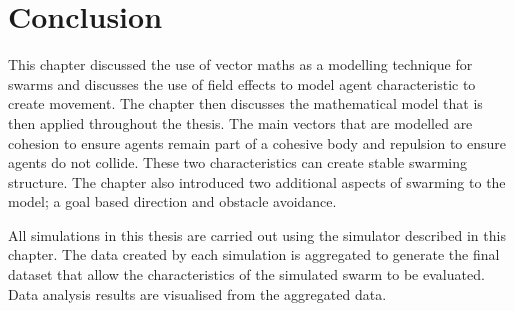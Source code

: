 \section{Conclusion}
This chapter discussed the use of vector maths as a modelling technique for swarms and discusses the use of field effects to model agent characteristic to create movement. The chapter then discusses the mathematical model that is then applied throughout the thesis. The main vectors that are modelled are cohesion to ensure agents remain part of a cohesive body and repulsion to ensure agents do not collide. These two characteristics can create stable swarming structure. The chapter also introduced two additional aspects of swarming to the model; a goal based direction and obstacle avoidance. 

All simulations in this thesis are carried out using the simulator described in this chapter. The data created by each simulation is aggregated to generate the final dataset that allow the characteristics of the simulated swarm to be evaluated. Data analysis results are visualised from the aggregated data. 

